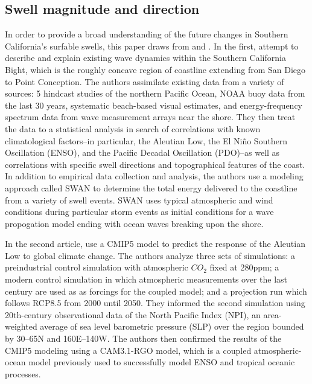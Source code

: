 \documentclass[12pt, letterpaper]{article}
\begin{document}
	\subsection{Swell magnitude and direction}
	In order to provide a broad understanding of the future changes in Southern California's surfable swells, this paper draws from \citet{swells-deep-water-waves} and \citet{swells-aleutian-low}. In the first, \citeauthor{swells-deep-water-waves} attempt to describe and explain existing wave dynamics within the Southern California Bight, which is the roughly concave region of coastline extending from San Diego to Point Conception. The authors assimilate existing data from a variety of sources: 5 hindcast studies of the northern Pacific Ocean, NOAA buoy data from the last 30 years, systematic beach-based visual estimates, and energy-frequency spectrum data from wave measurement arrays near the shore. They then treat the data to a statistical analysis in search of correlations with known climatological factors--in particular, the Aleutian Low, the El Ni\~{n}o Southern Oscillation (ENSO), and the Pacific Decadal Oscillation (PDO)--as well as correlations with specific swell directions and topographical features of the coast. In addition to empirical data collection and analysis, the authors use a modeling approach called SWAN to determine the total energy delivered to the coastline from a variety of swell events. SWAN uses typical atmospheric and wind conditions during particular storm events as initial conditions for a wave propogation model ending with ocean waves breaking upon the shore. \citep{swells-deep-water-waves}

	In the second article, \citeauthor{swells-aleutian-low} use a CMIP5 model to predict the response of the Aleutian Low to global climate change. The authors analyze three sets of simulations: a preindustrial control simulation with atmospheric $CO_2$ fixed at 280ppm; a modern control simulation in which atmospheric measurements over the last century are used as as forcings for the coupled model; and a projection run which follows RCP8.5 from 2000 until 2050. They informed the second simulation using 20th-century observational data of the North Pacific Index (NPI), an area-weighted average of sea level barometric pressure (SLP) over the region bounded by 30\degree –65\degree N and 160\degree E–140\degree W. The authors then confirmed the results of the CMIP5 modeling using a CAM3.1-RGO model, which is a coupled atmospheric-ocean model previously used to successfully model ENSO and tropical oceanic processes. \citep{swells-aleutian-low}
\end{document}
